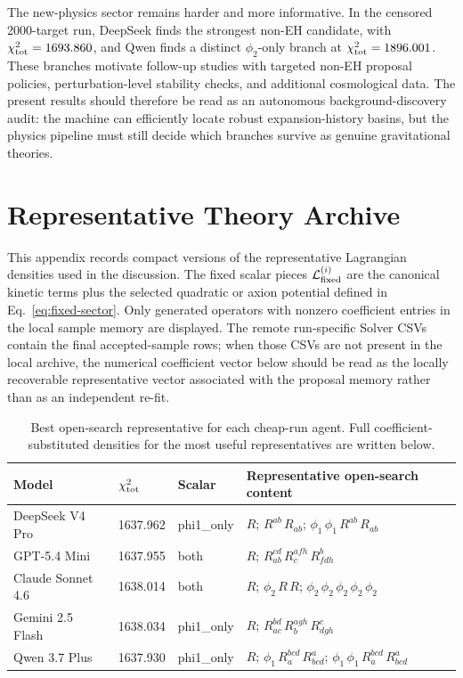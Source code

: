 \documentclass[aps,prd,twocolumn,superscriptaddress,nofootinbib,longbibliography]{revtex4-2}
\newcommand{\chiT}{\chi^2_{\rm tot}}
\begin{document}
The new-physics sector remains harder and more informative.  In the censored 2000-target run, DeepSeek finds the strongest non-EH candidate, with $\chiT=1693.860$, and Qwen finds a distinct $\phi_2$-only branch at $\chiT=1896.001$.  These branches motivate follow-up studies with targeted non-EH proposal policies, perturbation-level stability checks, and additional cosmological data.  The present results should therefore be read as an autonomous background-discovery audit: the machine can efficiently locate robust expansion-history basins, but the physics pipeline must still decide which branches survive as genuine gravitational theories.

\appendix

\section{Representative Theory Archive}
\label{app:theory-archive}

This appendix records compact versions of the representative Lagrangian densities used in the discussion.  The fixed scalar pieces $\mathcal{L}_{\rm fixed}^{(i)}$ are the canonical kinetic terms plus the selected quadratic or axion potential defined in Eq.~\eqref{eq:fixed-sector}.  Only generated operators with nonzero coefficient entries in the local sample memory are displayed.  The remote run-specific Solver CSVs contain the final accepted-sample rows; when those CSVs are not present in the local archive, the numerical coefficient vector below should be read as the locally recoverable representative vector associated with the proposal memory rather than as an independent re-fit.

\begin{table}[t]
\centering
\scriptsize
\begin{ruledtabular}
\begin{tabular}{llll}
Model & $\chiT$ & Scalar & Representative open-search content\\
\hline
DeepSeek V4 Pro & 1637.962 & phi1\_only & $R$; $R^{ab} \, R_{ab}$; $\phi_1 \, \phi_1 \, R^{ab} \, R_{ab}$ \\
GPT-5.4 Mini & 1637.955 & both & $R$; $R^{cd}_{ab} \, R^{afh}_{c} \, R^{b}_{fdh}$ \\
Claude Sonnet 4.6 & 1638.014 & both & $R$; $\phi_2 \, R \, R$; $\phi_2 \, \phi_2 \, \phi_2 \, \phi_2 \, \phi_2$ \\
Gemini 2.5 Flash & 1638.034 & phi1\_only & $R$; $R^{bd}_{ac} \, R^{agh}_{b} \, R^{c}_{dgh}$ \\
Qwen 3.7 Plus & 1637.930 & phi1\_only & $R$; $\phi_1 \, R^{bcd}_{a} \, R^{a}_{bcd}$; $\phi_1 \, \phi_1 \, R^{bcd}_{a} \, R^{a}_{bcd}$ \\
\end{tabular}
\end{ruledtabular}
\caption{Best open-search representative for each cheap-run agent.  Full coefficient-substituted densities for the most useful representatives are written below.}
\label{tab:appendix-open-best}
\end{table}
\end{document}

